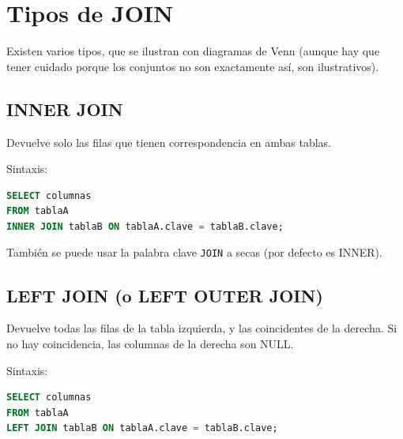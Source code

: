 \documentclass[12pt,a4paper,openany,oneside]{book}
\begin{document}
\section{Tipos de JOIN}
Existen varios tipos, que se ilustran con diagramas de Venn (aunque hay que tener cuidado porque los conjuntos no son exactamente así, son ilustrativos).

\subsection{INNER JOIN}
Devuelve solo las filas que tienen correspondencia en ambas tablas.
\begin{center}
\end{center}
Sintaxis:
\begin{lstlisting}[language=SQL]
SELECT columnas
FROM tablaA
INNER JOIN tablaB ON tablaA.clave = tablaB.clave;
\end{lstlisting}
También se puede usar la palabra clave \texttt{JOIN} a secas (por defecto es INNER).

\subsection{LEFT JOIN (o LEFT OUTER JOIN)}
Devuelve todas las filas de la tabla izquierda, y las coincidentes de la derecha. Si no hay coincidencia, las columnas de la derecha son NULL.
\begin{center}
\end{center}
Sintaxis:
\begin{lstlisting}[language=SQL]
SELECT columnas
FROM tablaA
LEFT JOIN tablaB ON tablaA.clave = tablaB.clave;
\end{lstlisting}
\end{document}
